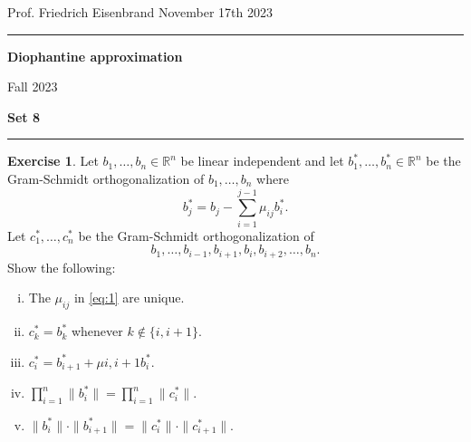 \documentclass[12pt,a4paper]{article}
\date{}
\theoremstyle{plain}
\newtheorem*{Sol*}{Solution}
\theoremstyle{definition}
\newtheorem{Ex}{Exercise}
\newif\ifsolutions
\newcommand{\exercise}[2]{
			\begin{Ex} #1 \end{Ex}
			\ifsolutions  \begin{Sol*} #2 \end{Sol*} \bigskip \else \bigskip  \fi
		}
\begin{document}
\begin{center}
{Prof. Friedrich Eisenbrand \hfill November 17th 2023}
\end{center}
	
\hrule\vspace{\baselineskip}

\begin{center}
\textbf{Diophantine approximation}

Fall 2023

\bigskip

\textbf{Set 8}
\ifsolutions{\textbf{- Solutions}} \else{} \fi
\end{center}

\hrule\vspace{\baselineskip}




\exercise{Let $b_1,\dots,b_n ∈ℝ^n$ be linear independent  and let $b_1^*,\dots,b_n^* ∈ ℝ^n$ be the Gram-Schmidt orthogonalization of $b_1,\dots,b_n$ where
  \begin{equation}
    \label{eq:1}
    b_j^* = b_j - ∑_{i=1}^{j-1}μ_{ij} b_i^*. 
  \end{equation}
  Let $c_1^*,\dots,c_n^*$ be the Gram-Schmidt orthogonalization of
  \begin{displaymath}
    b_1,\dots,b_{i-1},b_{i+1},b_i,b_{i+2},\dots,b_n.
  \end{displaymath}
  Show the following:
  \begin{enumerate}[i)]
  \item The $μ_{ij}$ in \eqref{eq:1} are unique.
  \item $c_k^* = b_k^*$ whenever $k ∉\{i,i+1\}$.
  \item $c_i^* = b_{i+1}^* + μ{i,i+1} b_i^*$.
  \item $∏_{i=1}^n \|b_i^*\| = ∏_{i=1}^n \|c_i^*\|$. 
  \item $\|b_i^*\| ⋅\|b_{i+1}^*\| = \|c_i^*\| ⋅\|c_{i+1}^*\|$.
  \end{enumerate}

  }{}
\end{document}
